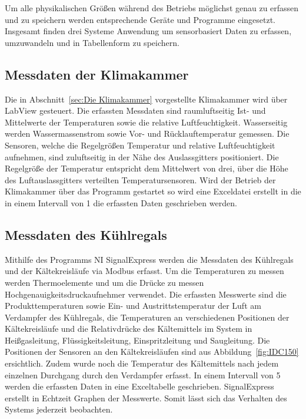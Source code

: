 Um alle physikalischen Größen während des Betriebs möglichst genau zu erfassen und zu speichern werden entsprechende Geräte und Programme eingesetzt. Insgesamt finden drei Systeme Anwendung um sensorbasiert Daten zu erfassen, umzuwandeln und in Tabellenform zu speichern.

\subsection{Messdaten der Klimakammer}
\label{subsec:Messdaten der Klimakammer}

Die in Abschnitt~\ref{sec:Die Klimakammer} vorgestellte Klimakammer wird über LabView gesteuert. Die erfassten Messdaten sind raumluftseitig Ist- und Mittelwerte der Temperaturen sowie die relative Luftfeuchtigkeit. Wasserseitig werden Wassermassenstrom sowie Vor- und Rücklauftemperatur gemessen. 
Die Sensoren, welche die Regelgrößen Temperatur und relative Luftfeuchtigkeit aufnehmen, sind zuluftseitig in der Nähe des Auslassgitters positioniert. Die Regelgröße der Temperatur entspricht dem Mittelwert von drei, über die Höhe des Luftauslassgitters verteilten Temperatursensoren. Wird der Betrieb der Klimakammer über das Programm gestartet so wird eine Exceldatei erstellt in die in einem Intervall von \unit{1}{\second} die erfassten Daten geschrieben werden.


\subsection{Messdaten des Kühlregals}
\label{subsec:Messdaten der Klimakammer}

Mithilfe des Programms NI SignalExpress werden die Messdaten des Kühlregals und der Kältekreisläufe via Modbus erfasst. Um die Temperaturen zu messen werden Thermoelemente  und um die Drücke zu messen Hochgenauigkeitsdruckaufnehmer verwendet. Die erfassten Messwerte sind die Produkttemperaturen sowie Ein- und Austrittstemperatur der Luft am Verdampfer des Kühlregals, die Temperaturen an verschiedenen Positionen der Kältekreisläufe und die Relativdrücke des Kältemittels im System in Heißgasleitung, Flüssigkeitsleitung, Einspritzleitung und Saugleitung. Die Positionen der Sensoren an den Kältekreisläufen sind aus Abbildung~\ref{fig:IDC150} ersichtlich. Zudem wurde noch die Temperatur des Kältemittels nach jedem einzelnen Durchgang durch den Verdampfer erfasst.
In einem Intervall von \unit{5}{\second} werden die erfassten Daten in eine Exceltabelle geschrieben. SignalExpress erstellt in Echtzeit Graphen der Messwerte. Somit lässt sich das Verhalten des Systems jederzeit beobachten.


